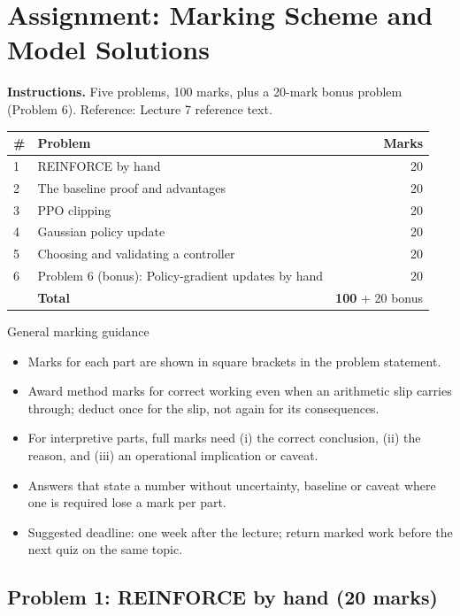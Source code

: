 \documentclass[11pt]{article}
\begin{document}
\section{Assignment: Marking Scheme and Model Solutions}

\textbf{Instructions.} Five problems, 100 marks, plus a 20-mark bonus problem (Problem 6). Reference: Lecture 7 reference text.

\begin{center}\small\renewcommand{\arraystretch}{1.25}\begin{tabularx}{0.85\textwidth}{@{}l X r@{}}\toprule\textbf{\#} & \textbf{Problem} & \textbf{Marks}\\\midrule1 & REINFORCE by hand & 20\\
2 & The baseline proof and advantages & 20\\
3 & PPO clipping & 20\\
4 & Gaussian policy update & 20\\
5 & Choosing and validating a controller & 20\\
6 & Problem 6 (bonus): Policy-gradient updates by hand & 20\\\midrule & \textbf{Total} & \textbf{100} + 20 bonus\\\bottomrule\end{tabularx}\end{center}

\begin{instr}{General marking guidance}\begin{itemize}
\item Marks for each part are shown in square brackets in the problem statement.
\item Award method marks for correct working even when an arithmetic slip carries through; deduct once for the slip, not again for its consequences.
\item For interpretive parts, full marks need (i) the correct conclusion, (ii) the reason, and (iii) an operational implication or caveat.
\item Answers that state a number without uncertainty, baseline or caveat where one is required lose a mark per part.
\item Suggested deadline: one week after the lecture; return marked work before the next quiz on the same topic.
\end{itemize}\end{instr}

\subsection{Problem 1: REINFORCE by hand \normalfont\small\color{GreyN}(20 marks)}
\end{document}
